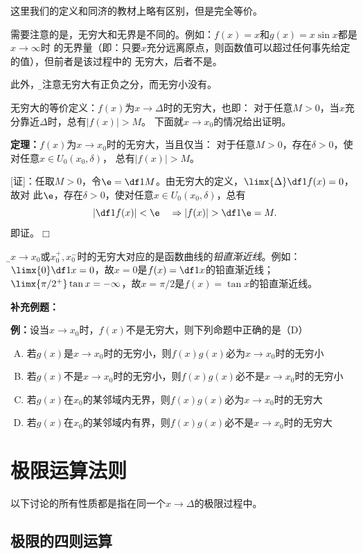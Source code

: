 这里我们的定义和同济的教材上略有区别，但是完全等价。

需要注意的是，无穷大和无界是不同的。例如：$f(x)=x$和$g(x)=x\sin x$都是$x\to\infty$时
的无界量（即：只要$x$充分远离原点，则函数值可以超过任何事先给定的值），但前者是该过程中的
无穷大，后者不是。

此外，{\b 要注意无穷大有正负之分，而无穷小没有。}

无穷大的等价定义：$f(x)$为$x\to\Delta$时的无穷大，也即：
对于任意$M>0$，当$x$充分靠近$\Delta$时，总有$|f(x)|>M$。
下面就$x\to x_0$的情况给出证明。

\begin{thx}
	{\bf 定理：}$f(x)$为$x\to x_0$时的无穷大，当且仅当：
	对于任意$M>0$，存在$\delta>0$，使对任意$x\in U_0(x_0,\delta)$，
	总有$|f(x)|>M$。
\end{thx}

[证]：任取$M>0$，令$\e=\df1M$。由无穷大的定义，$\limx{\Delta}\df1{f(x)}=0$，故对
此$\e$，存在$\delta>0$，使对任意$x\in U_0(x_0,\delta)$，总有
$$\left|\df1{f(x)}\right|<\e\quad\Rightarrow |f(x)|>\df1{\e}=M.$$
即证。\hfill $\Box$

{\b$x\to x_0$或$x_0^+,x_0^-$时的无穷大对应的是函数曲线的{\it 铅直渐近线}}。例如：
$\limx{0}\df1x=0$，故$x=0$是$f(x)=\df1x$的铅直渐近线；
$\limx{\pi/2^+}\tan x=-\infty$，故$x=\pi/2$是$f(x)=\tan x$的铅直渐近线。

{\bf 补充例题：}

{\bf 例：}设当$x\to
x_0$时，$f(x)$不是无穷大，则下列命题中正确的是（D）
\begin{enumerate}[(A)]
  \setlength{\itemindent}{1cm}
  \item 若$g(x)$是$x\to x_0$时的无穷小，则$f(x)g(x)$必为$x\to x_0$时的无穷小
  \item 若$g(x)$不是$x\to x_0$时的无穷小，则$f(x)g(x)$必不是$x\to x_0$时的无穷小
  \item 若$g(x)$在$x_0$的某邻域内无界，则$f(x)g(x)$必为$x\to x_0$时的无穷大
  \item 若$g(x)$在$x_0$的某邻域内有界，则$f(x)g(x)$必不是$x\to x_0$时的无穷大
\end{enumerate}

\section{极限运算法则}

以下讨论的所有性质都是指在同一个$x\to\Delta$的极限过程中。

\subsection{极限的四则运算}

